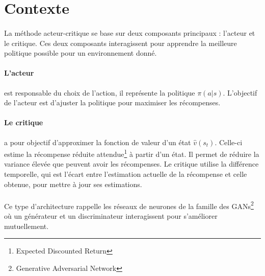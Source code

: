 \vspace{-0.2cm}
\section{Contexte}

\paragraph{}
La méthode acteur-critique se base sur deux composants principaux : l'acteur et le critique. 
Ces deux composants interagissent pour apprendre la meilleure politique possible pour un environnement donné.

\vspace{-0.2cm}
\paragraph{L'acteur} est responsable du choix de l'action, il représente la politique $\pi(a|s)$. 
L'objectif de l'acteur est d'ajuster la politique pour maximiser les récompenses.

\vspace{-0.2cm}
\paragraph{Le critique} a pour objectif d'approximer la fonction de valeur d'un état $\hat{v}(s_t)$. 
Celle-ci estime la récompense réduite attendue\footnote{Expected Discounted Return} à partir d'un état.
Il permet de réduire la variance élevée que peuvent avoir les récompenses.
Le critique utilise la différence temporelle, 
qui est l'écart entre l'estimation actuelle de la récompense et celle obtenue, pour mettre à jour ses estimations.

\vspace{-0.2cm}
\paragraph{}
Ce type d'architecture rappelle les réseaux de neurones de la famille des GANs\footnote{Generative Adversarial Network} 
où un générateur et un discriminateur interagissent pour s'améliorer mutuellement.

